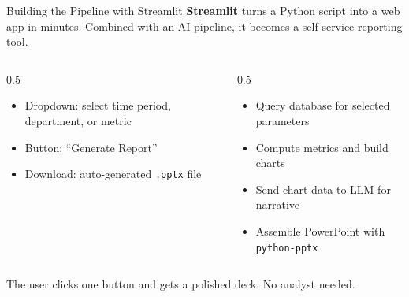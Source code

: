 \documentclass[aspectratio=169]{beamer}
\begin{document}
\begin{frame}{Building the Pipeline with Streamlit}
\textbf{Streamlit} turns a Python script into a web app in minutes.  Combined with an AI pipeline, it becomes a \alert{self-service reporting tool}.
\vspace{0.3cm}
\begin{columns}[T]
\begin{column}{0.5\textwidth}
\begin{shadedbox}[title=\textbf{User Interface}]
\begin{itemize}\small
  \item Dropdown: select time period, department, or metric
  \item Button: ``Generate Report''
  \item Download: auto-generated \texttt{.pptx} file
\end{itemize}
\end{shadedbox}
\end{column}
\begin{column}{0.5\textwidth}
\begin{shadedbox}[title=\textbf{Behind the Scenes}]
\begin{itemize}\small
  \item Query database for selected parameters
  \item Compute metrics and build charts
  \item Send chart data to LLM for narrative
  \item Assemble PowerPoint with \texttt{python-pptx}
\end{itemize}
\end{shadedbox}
\end{column}
\end{columns}
\vspace{0.3cm}
The user clicks one button and gets a polished deck.  \alert{No analyst needed.}
\end{frame}
\end{document}
